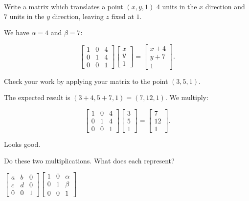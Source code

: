 \documentclass[../key.tex]{subfiles}
\begin{document}
\begin{inner_problem}[start=1]
\item Write a matrix which translates a point $(x,y,1)$ $4$ units in the $x$ direction and $7$ units in the $y$ direction, leaving $z$ fixed at $1$.
\end{inner_problem}

We have $\alpha = 4$ and $\beta = 7$:

$$\begin{bmatrix} 1 & 0 & 4 \\ 0 & 1 & 4 \\ 0 & 0 & 1 \end{bmatrix} \begin{bmatrix} x \\ y \\ 1 \end{bmatrix} = \begin{bmatrix} x + 4 \\ y + 7 \\ 1 \end{bmatrix}.$$

\begin{inner_problem}
\item Check your work by applying your matrix to the point $(3,5,1)$.
\end{inner_problem}

The expected result is $(3+4,5+7,1)=(7,12,1)$. We multiply:

$$\begin{bmatrix} 1 & 0 & 4 \\ 0 & 1 & 4 \\ 0 & 0 & 1 \end{bmatrix} \begin{bmatrix} 3 \\ 5 \\ 1 \end{bmatrix} = \begin{bmatrix} 7 \\ 12 \\ 1 \end{bmatrix}.$$

Looks good.

\begin{outer_problem}
\item Do these two multiplications. What does each represent?
\end{outer_problem}

\begin{inner_problem}[start=1]
\item $\left[\begin{array}{ccc}a & b & 0 \\ c & d & 0 \\ 0 & 0 & 1 \end{array}\right]\left[\begin{array}{ccc} 1 & 0 & \alpha \\ 0 & 1 & \beta \\ 0 & 0 & 1 \end{array}\right]$
\end{inner_problem}
\end{document}
